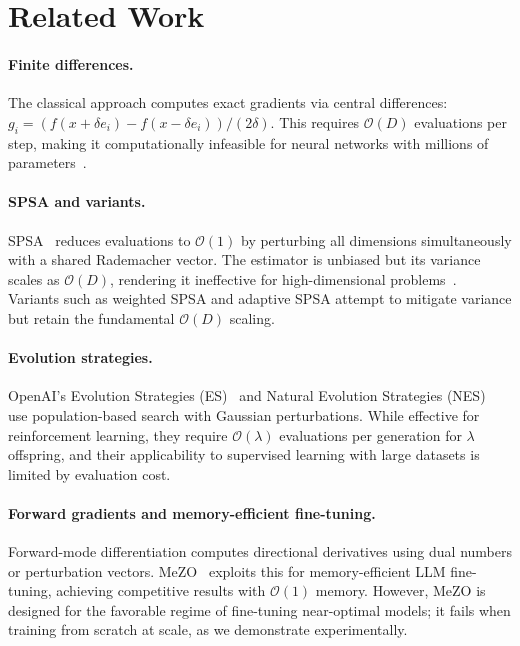 \documentclass[10pt]{article}
\begin{document}
\section{Related Work}
\label{sec:related}

\paragraph{Finite differences.}
The classical approach computes exact gradients via central differences: $g_i = (f(x + \delta e_i) - f(x - \delta e_i)) / (2\delta)$. This requires $\mathcal{O}(D)$ evaluations per step, making it computationally infeasible for neural networks with millions of parameters~\citep{nocedal2006numerical,bertsekas2019nonlinear}.

\paragraph{SPSA and variants.}
SPSA~\citep{spall1992multivariate} reduces evaluations to $\mathcal{O}(1)$ by perturbing all dimensions simultaneously with a shared Rademacher vector. The estimator is unbiased but its variance scales as $\mathcal{O}(D)$, rendering it ineffective for high-dimensional problems~\citep{ghadimi2013optimal}. Variants such as weighted SPSA and adaptive SPSA attempt to mitigate variance but retain the fundamental $\mathcal{O}(D)$ scaling.

\paragraph{Evolution strategies.}
OpenAI's Evolution Strategies (ES)~\citep{salimans2013evolution} and Natural Evolution Strategies (NES)~\citep{wierstra2014natural} use population-based search with Gaussian perturbations. While effective for reinforcement learning, they require $\mathcal{O}(\lambda)$ evaluations per generation for $\lambda$ offspring, and their applicability to supervised learning with large datasets is limited by evaluation cost.

\paragraph{Forward gradients and memory-efficient fine-tuning.}
Forward-mode differentiation computes directional derivatives using dual numbers or perturbation vectors. MeZO~\citep{malladi2023mezo} exploits this for memory-efficient LLM fine-tuning, achieving competitive results with $\mathcal{O}(1)$ memory. However, MeZO is designed for the favorable regime of fine-tuning near-optimal models; it fails when training from scratch at scale, as we demonstrate experimentally.
\end{document}
